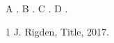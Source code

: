\documentclass{article}
\begin{document}
A \citep[e.g.][]{k}. B \citep[e.g.][p.~3]{k}. C \citep[p.~3]{k}. D \citet[see][]{k}.
\begin{thebibliography}{1}
 J. Rigden, Title, 2017.
\end{thebibliography}
\end{document}
